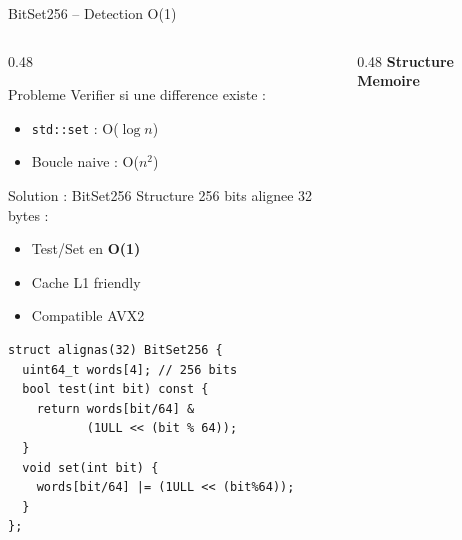 \documentclass[aspectratio=169,9pt]{beamer}
\begin{document}
\begin{frame}[fragile,shrink=5]{BitSet256 -- Detection O(1)}
    \begin{columns}[T]
        \begin{column}{0.48\textwidth}
            \begin{block}{Probleme}
                Verifier si une difference existe :
                \begin{itemize}\small
                    \item \texttt{std::set} : O($\log n$)
                    \item Boucle naive : O($n^2$)
                \end{itemize}
            \end{block}
            \vspace{0.1cm}
            \begin{exampleblock}{Solution : BitSet256}
                \small
                Structure 256 bits alignee 32 bytes :
                \begin{itemize}\small
                    \item Test/Set en \textbf{O(1)}
                    \item Cache L1 friendly
                    \item Compatible AVX2
                \end{itemize}
            \end{exampleblock}
            \vspace{0.1cm}
\begin{lstlisting}
struct alignas(32) BitSet256 {
  uint64_t words[4]; // 256 bits
  bool test(int bit) const {
    return words[bit/64] &
           (1ULL << (bit % 64));
  }
  void set(int bit) {
    words[bit/64] |= (1ULL << (bit%64));
  }
};
\end{lstlisting}
        \end{column}
        \begin{column}{0.48\textwidth}
            \centering
            \textbf{Structure Memoire}\\[0.2cm]
\end{column}
\end{columns}
\end{frame}
\end{document}
